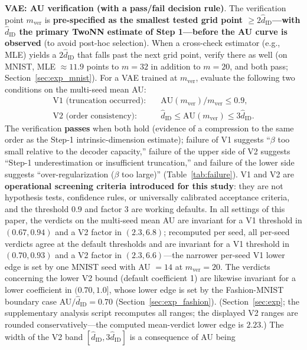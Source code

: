 \documentclass[make,article,submit,pdftex,moreauthors]{Definitions/mdpi}
\newcommand{\hatdID}{\hat{d}_{\mathrm{ID}}}
\begin{document}
\textbf{VAE: AU verification (with a pass/fail decision rule)}.
The verification point $m_{\mathrm{ver}}$ is \textbf{pre-specified as the
smallest tested grid point $\geq 2\hatdID$---with $\hatdID$ the primary
TwoNN estimate of Step 1---before the AU curve is observed} (to avoid
post-hoc selection).
When a cross-check estimator (e.g., MLE) yields a $2\hatdID$ that falls
past the next grid point, verify there as well (on MNIST, MLE
$\approx 11.9$ points to $m = 32$ in addition to $m = 20$, and both pass;
Section~\ref{sec:exp_mnist}).
For a VAE trained at $m_{\mathrm{ver}}$, evaluate the following two
conditions on the multi-seed mean AU:
\begin{align}
  \text{V1 (truncation occurred)}:&\quad
  \mathrm{AU}(m_{\mathrm{ver}}) / m_{\mathrm{ver}} \leq 0.9,
  \label{eq:rule_v1}\\
  \text{V2 (order consistency)}:&\quad
  \hatdID \leq \mathrm{AU}(m_{\mathrm{ver}}) \leq 3\hatdID.
  \label{eq:rule_v2}
\end{align}
The verification \textbf{passes} when both hold (evidence of a compression
to the same order as the Step-1 intrinsic-dimension estimate);
failure of V1 suggests ``$\beta$ too small relative to the decoder
capacity,'' failure of the upper side of V2 suggests ``Step-1
underestimation or insufficient truncation,'' and failure of the lower side
suggests ``over-regularization ($\beta$ too large)''
(Table~\ref{tab:failure}).
V1 and V2 are \textbf{operational screening criteria introduced for this
study}: they are not hypothesis tests, confidence rules, or universally
calibrated acceptance criteria, and the threshold $0.9$ and factor $3$ are
working defaults.
In all settings of this paper, the verdicts on the multi-seed mean AU are
invariant for a V1 threshold in $(0.67, 0.94)$ and a V2 factor in
$(2.3, 6.8)$; recomputed per seed, all per-seed verdicts agree at the
default thresholds and are invariant for a V1 threshold in $(0.70, 0.93)$ and
a V2 factor in $(2.3, 6.6)$---the narrower per-seed V1 lower edge is set by
one MNIST seed with AU $= 14$ at $m_{\mathrm{ver}} = 20$.
The verdicts concerning the lower V2 bound (default coefficient 1) are
likewise invariant for a lower coefficient in $(0.70, 1.0]$, whose lower
edge is set by the Fashion-MNIST boundary case AU$/\hatdID = 0.70$
(Section~\ref{sec:exp_fashion}).
(Section~\ref{sec:exp}; the supplementary analysis script recomputes all
ranges; the displayed V2 ranges are rounded conservatively---the computed
mean-verdict lower edge is $2.23$.)
The width of the V2 band $[\hatdID, 3\hatdID]$ is a consequence of AU being
\end{document}
